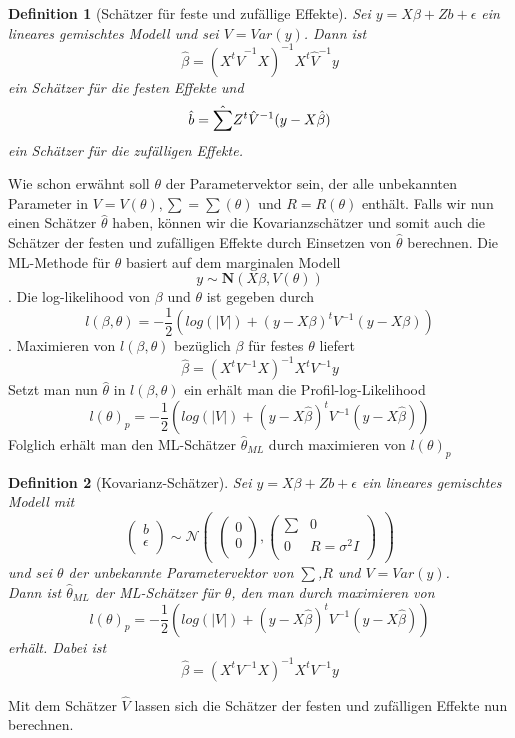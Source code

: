 \documentclass[%
thesis=student,%
coverpage=false,%
titlepage=false,%
headmarks=true, %
german,%
font=libertine, %
math=newpxtx, %
BCOR=5mm,%
coverBCOR=11mm%
]{tumbook}
\theoremstyle{break}
\newtheorem{definition}{Definition}[section]
\begin{document}
\begin{definition}[Schätzer für feste und zufällige Effekte]
	Sei $y = X\beta + Zb + \epsilon$ ein lineares gemischtes Modell und sei $V = Var(y)$.
	Dann ist $$\hat{\beta} = (X^t \hat{V}^{-1}X)^{-1}X^t \hat{V}^{-1}y$$ ein Schätzer für die festen Effekte und $$ \hat{b} = \hat{\tiny\sum} Z^t\hat{V}^{-1}(y-X\hat{\beta})$$ ein Schätzer für die zufälligen Effekte.
\end{definition}

Wie schon erwähnt soll $\theta$ der Parametervektor sein, der alle unbekannten Parameter in $V= V(\theta), \sum = \sum(\theta)$ und $R = R (\theta)$ enthält. Falls wir nun einen Schätzer $\hat{\theta}$ haben, können wir die Kovarianzschätzer und somit auch die Schätzer der festen und zufälligen Effekte durch Einsetzen von $\hat{\theta}$ berechnen. 
Die ML-Methode für $\theta$ basiert auf dem marginalen Modell 
$$y \sim \mathbf{N}(X\beta,V(\theta))$$.
Die log-likelihood von $\beta$ und $\theta$ ist gegeben durch
$$l(\beta,\theta) = - \frac{1}{2} (log(|V|)+(y-X\beta)^tV^{-1}(y-X\beta))$$.
Maximieren von $l(\beta,\theta)$ bezüglich $\beta$ für festes $\theta$ liefert 
$$ \hat{\beta} = (X^tV^{-1}X)^{-1}X^tV^{-1}y $$
Setzt man nun $\hat{\theta}$ in $l(\beta,\theta)$ ein erhält man die Profil-log-Likelihood 
$$ l(\theta)_p = - \frac{1}{2} (log(|V|)+(y-X\hat{\beta})^tV^{-1}(y-X\hat{\beta}))$$
Folglich erhält man den ML-Schätzer $\hat{\theta}_{ML}$ durch maximieren von $l(\theta)_p$ 
\begin{definition}[Kovarianz-Schätzer]
	Sei $y = X\beta + Zb + \epsilon $ ein lineares gemischtes Modell mit $$\begin{pmatrix}
		b \\
		\epsilon \\
	\end{pmatrix}
	\sim
	\mathcal{N}
	\begin{pmatrix}
		\begin{pmatrix}
			
			0 \\
			0 \\
		\end{pmatrix},
		\begin{pmatrix}
			\sum & 0 \\
			0 & R = \sigma^2I \\
		\end{pmatrix}
	\end{pmatrix}$$ und sei $\theta$ der unbekannte Parametervektor von $\sum$,$R$ und $V=Var(y)$. \\
	Dann ist $\hat{\theta}_{ML}$ der ML-Schätzer für $\theta$, den man durch maximieren von $$  l(\theta)_p = - \frac{1}{2} (log(|V|)+(y-X\hat{\beta})^tV^{-1}(y-X\hat{\beta})) $$erhält.
	Dabei ist $$ \hat{\beta} = (X^tV^{-1}X)^{-1}X^tV^{-1}y$$
\end{definition} \noindent
 Mit dem Schätzer $\hat{V}$ lassen sich die Schätzer der festen und zufälligen Effekte nun berechnen.
 
\end{document}

